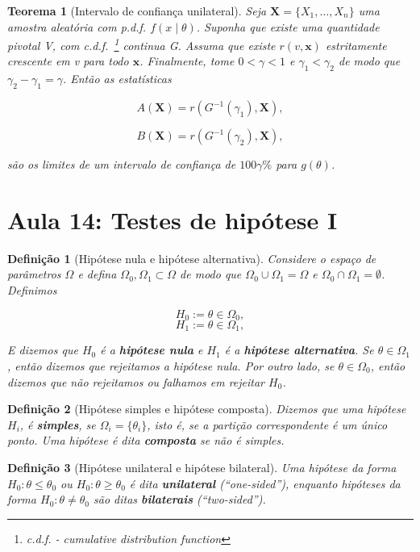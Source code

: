 \documentclass{article}
\newtheorem{theorem}{Teorema}
\newtheorem{definition}{Definição}
\begin{document}
	\begin{theorem}[Intervalo de confiança unilateral]
		Seja $\textbf{X} = \{ X_1, \ldots, X_n \}$ uma amostra aleatória com p.d.f. $f(x \mid \theta)$. Suponha que existe uma quantidade pivotal V, com c.d.f.~\footnote{c.d.f. - cumulative distribution function} continua G. Assuma que existe $r(v, \textbf{x})$ estritamente crescente em v para todo $\textbf{x}$. Finalmente, tome $0 < \gamma < 1$ e $\gamma_1 < \gamma_2$ de modo que $\gamma_2 - \gamma_1 = \gamma$. Então as estatísticas
		
		$$A(\textbf{X}) = r(G^{-1}(\gamma_1), \textbf{X}),$$
		
		$$B(\textbf{X}) = r(G^{-1}(\gamma_2), \textbf{X}),$$
		
		são os limites de um intervalo de confiança de $100\gamma \%$ para $g(\theta)$.
	\end{theorem}
	
	
	\section*{Aula 14: Testes de hipótese I}
	\label{s14}
	\begin{definition}[Hipótese nula e hipótese alternativa]
		Considere o espaço de parâmetros $\Omega$ e defina $\Omega_0, \Omega_1 \subset \Omega$ de modo que $\Omega_0 \cup \Omega_1 = \Omega$ e $\Omega_0 \cap \Omega_1 = \emptyset$. Definimos
		
		$$H_0 := \theta \in \Omega_0,$$
		$$H_1 := \theta \in \Omega_1,$$
		
		E dizemos que $H_0$ é a \textbf{hipótese nula} e $H_1$ é a \textbf{hipótese alternativa}.
		Se $\theta \in \Omega_1$, então dizemos que rejeitamos a hipótese nula. Por outro lado, se $\theta \in \Omega_0$, então dizemos que não rejeitamos ou falhamos em rejeitar $H_0$.
	\end{definition}
	
	\begin{definition}[Hipótese simples e hipótese composta]
		Dizemos que uma hipótese $H_i$, é \textbf{simples}, se $\Omega_i = \{ \theta_i \}$, isto é, se a partição correspondente é um único ponto. Uma hipótese é dita \textbf{composta} se não é simples.
	\end{definition}
	
	\begin{definition}[Hipótese unilateral e hipótese bilateral]
		Uma hipótese da forma $H_0 : \theta \leq \theta_0$ ou $H_0 : \theta \geq \theta_0$ é dita \textbf{unilateral} (``one-sided''), enquanto hipóteses da forma $H_0 : \theta \neq \theta_0$ são ditas \textbf{bilaterais} (``two-sided'').
	\end{definition}
	
\end{document}
